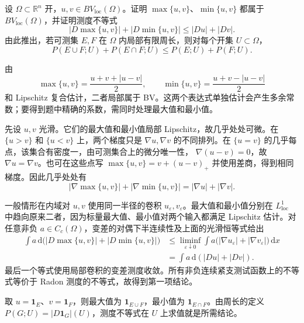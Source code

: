 \begin{exercise}\label{g3:ex:bv-lattice-variation}
	设 \(\Omega\subset\mathbb R^n\) 开，\(u,v\in BV_{\mathrm{loc}}(\Omega)\)。证明 \(\max\{u,v\}\)、\(\min\{u,v\}\) 都属于 \(BV_{\mathrm{loc}}(\Omega)\)，并证明测度不等式
	\[
		|D\max\{u,v\}|+|D\min\{u,v\}|
		\le|Du|+|Dv|.
	\]
	由此推出，若可测集 \(E,F\) 在 \(\Omega\) 内局部有限周长，则对每个开集 \(U\subset\Omega\)，
	\[
		P(E\cup F;U)+P(E\cap F;U)\le P(E;U)+P(F;U).
	\]
\end{exercise}
\begin{solution}
	由
	\[
		\max\{u,v\}=\frac{u+v+|u-v|}{2},\qquad
		\min\{u,v\}=\frac{u+v-|u-v|}{2}
	\]
	和 Lipschitz 复合估计，二者局部属于 BV。这两个表达式单独估计会产生多余常数；要得到题中精确的系数，需同时处理最大值和最小值。

	先设 \(u,v\) 光滑。它们的最大值和最小值局部 Lipschitz，故几乎处处可微。在 \(\{u>v\}\) 和 \(\{u<v\}\) 上，两个梯度只是 \(\nabla u,\nabla v\) 的不同排列。在 \(\{u=v\}\) 的几乎每点，该集合有密度一，由可测集合上的微分唯一性，
	\(\nabla(u-v)=0\)，故 \(\nabla u=\nabla v\)。也可在这些点写
	\(\max\{u,v\}=v+(u-v)_+\) 并使用差商，得到相同梯度。因此几乎处处有
	\[
		|\nabla\max\{u,v\}|+|\nabla\min\{u,v\}|
		=|\nabla u|+|\nabla v|.
	\]

	一般情形在内域对 \(u,v\) 使用同一半径的卷积 \(u_\varepsilon,v_\varepsilon\)。最大值和最小值分别在 \(L^1_{\mathrm{loc}}\) 中趋向原来二者，因为标量最大值、最小值对两个输入都满足 Lipschitz 估计。对任意非负 \(a\in C_c(\Omega)\)，变差的对偶下半连续性及上面的光滑恒等式给出
	\begin{align*}
		\int a\,\mathrm d\bigl(|D\max\{u,v\}|+|D\min\{u,v\}|\bigr)
		&\le\liminf_{\varepsilon\downarrow0}
		\int a\bigl(|\nabla u_\varepsilon|+|\nabla v_\varepsilon|\bigr)\,\mathrm dx\\
		&=\int a\,\mathrm d(|Du|+|Dv|).
	\end{align*}
	最后一个等式使用局部卷积的变差测度收敛。所有非负连续紧支测试函数上的不等式等价于 Radon 测度的不等式，故得到第一项结论。

	取 \(u=\mathbf1_E\)、\(v=\mathbf1_F\)，则最大值为 \(\mathbf1_{E\cup F}\)，最小值为 \(\mathbf1_{E\cap F}\)。由周长的定义 \(P(G;U)=|D\mathbf1_G|(U)\)，测度不等式在 \(U\) 上求值就是所需结论。
\end{solution}

